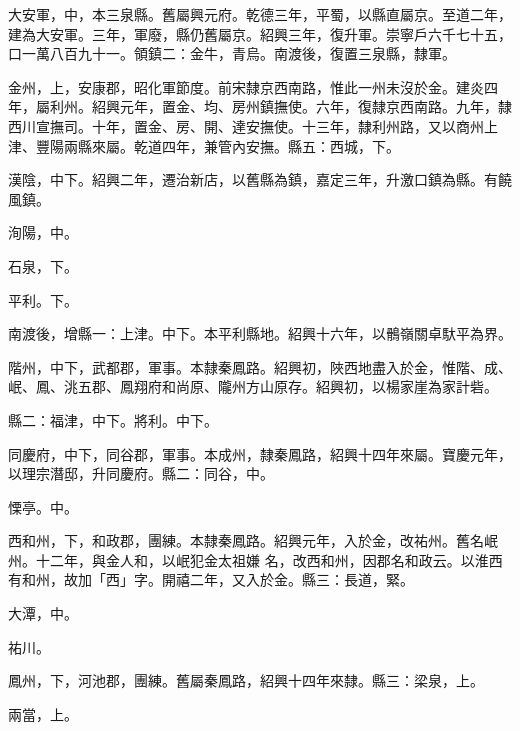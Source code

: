 \begin{pinyinscope}
 大安軍，中，本三泉縣。舊屬興元府。乾德三年，平蜀，以縣直屬京。至道二年，建為大安軍。三年，軍廢，縣仍舊屬京。紹興三年，復升軍。崇寧戶六千七十五，口一萬八百九十一。領鎮二：金牛，青烏。南渡後，復置三泉縣，隸軍。



 金州，上，安康郡，昭化軍節度。前宋隸京西南路，惟此一州未沒於金。建炎四年，屬利州。紹興元年，置金、均、房州鎮撫使。六年，復隸京西南路。九年，隸西川宣撫司。十年，置金、房、開、達安撫使。十三年，隸利州路，又以商州上津、豐陽兩縣來屬。乾道四年，兼管內安撫。縣五：西城，下。



 漢陰，中下。紹興二年，遷治新店，以舊縣為鎮，嘉定三年，升激口鎮為縣。有饒風鎮。



 洵陽，中。



 石泉，下。



 平利。下。



 南渡後，增縣一：上津。中下。本平利縣地。紹興十六年，以鶻嶺關卓馱平為界。



 階州，中下，武都郡，軍事。本隸秦鳳路。紹興初，陜西地盡入於金，惟階、成、岷、鳳、洮五郡、鳳翔府和尚原、隴州方山原存。紹興初，以楊家崖為家計砦。



 縣二：福津，中下。將利。中下。



 同慶府，中下，同谷郡，軍事。本成州，隸秦鳳路，紹興十四年來屬。寶慶元年，以理宗潛邸，升同慶府。縣二：同谷，中。



 慄亭。中。



 西和州，下，和政郡，團練。本隸秦鳳路。紹興元年，入於金，改祐州。舊名岷州。十二年，與金人和，以岷犯金太祖嫌
 名，改西和州，因郡名和政云。以淮西有和州，故加「西」字。開禧二年，又入於金。縣三：長道，緊。



 大潭，中。



 祐川。



 鳳州，下，河池郡，團練。舊屬秦鳳路，紹興十四年來隸。縣三：梁泉，上。



 兩當，上。




\end{pinyinscope}
